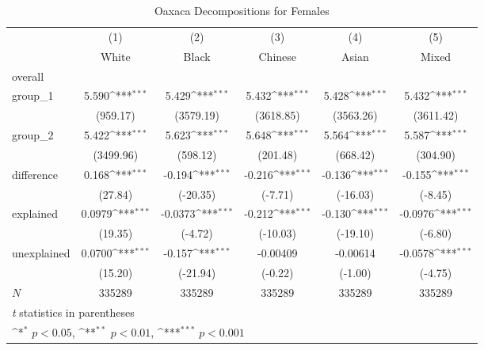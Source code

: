 \begin{table}[htbp]\centering
\def\sym#1{\ifmmode^{#1}\else\(^{#1}\)\fi}
\caption{Oaxaca Decompositions for Females\label{tab1}}
\begin{tabular}{l*{5}{c}}
\hline\hline
            &\multicolumn{1}{c}{(1)}&\multicolumn{1}{c}{(2)}&\multicolumn{1}{c}{(3)}&\multicolumn{1}{c}{(4)}&\multicolumn{1}{c}{(5)}\\
            &\multicolumn{1}{c}{White}&\multicolumn{1}{c}{Black}&\multicolumn{1}{c}{Chinese}&\multicolumn{1}{c}{Asian}&\multicolumn{1}{c}{Mixed}\\
\hline
overall     &                     &                     &                     &                     &                     \\
group\_1     &       5.590\sym{***}&       5.429\sym{***}&       5.432\sym{***}&       5.428\sym{***}&       5.432\sym{***}\\
            &    (959.17)         &   (3579.19)         &   (3618.85)         &   (3563.26)         &   (3611.42)         \\
group\_2     &       5.422\sym{***}&       5.623\sym{***}&       5.648\sym{***}&       5.564\sym{***}&       5.587\sym{***}\\
            &   (3499.96)         &    (598.12)         &    (201.48)         &    (668.42)         &    (304.90)         \\
difference  &       0.168\sym{***}&      -0.194\sym{***}&      -0.216\sym{***}&      -0.136\sym{***}&      -0.155\sym{***}\\
            &     (27.84)         &    (-20.35)         &     (-7.71)         &    (-16.03)         &     (-8.45)         \\
explained   &      0.0979\sym{***}&     -0.0373\sym{***}&      -0.212\sym{***}&      -0.130\sym{***}&     -0.0976\sym{***}\\
            &     (19.35)         &     (-4.72)         &    (-10.03)         &    (-19.10)         &     (-6.80)         \\
unexplained &      0.0700\sym{***}&      -0.157\sym{***}&    -0.00409         &    -0.00614         &     -0.0578\sym{***}\\
            &     (15.20)         &    (-21.94)         &     (-0.22)         &     (-1.00)         &     (-4.75)         \\
\hline
\(N\)       &      335289         &      335289         &      335289         &      335289         &      335289         \\
\hline\hline
\multicolumn{6}{l}{\footnotesize \textit{t} statistics in parentheses}\\
\multicolumn{6}{l}{\footnotesize \sym{*} \(p<0.05\), \sym{**} \(p<0.01\), \sym{***} \(p<0.001\)}\\
\end{tabular}
\end{table}
